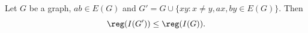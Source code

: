 \begin{theorem}\label{thm:reg(D')}
Let $G$ be a graph, $ab \in E(G)$ and $G'=G \cup \{xy: x\neq y,  ax,by \in E(G)\}$. Then
 $$\reg (I(G') ) \leq \reg(I(G)).$$
\end{theorem}

